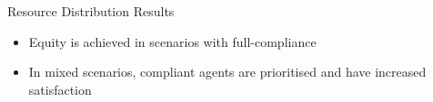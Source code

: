 \documentclass[xcolor={table}]{beamer}
\begin{document}
\begin{frame}[fragile=singleslide,t]
\begin{columns}[onlytextwidth,T]
\begin{column}{.48\textwidth}
\begin{block}{Resource Distribution Results}
\begin{itemize}
    \item Equity is achieved in scenarios with full-compliance
    \item In mixed scenarios, compliant agents are prioritised and have increased satisfaction
\end{itemize}


\end{block}




\end{column}
\end{columns}
\end{frame}
\end{document}
